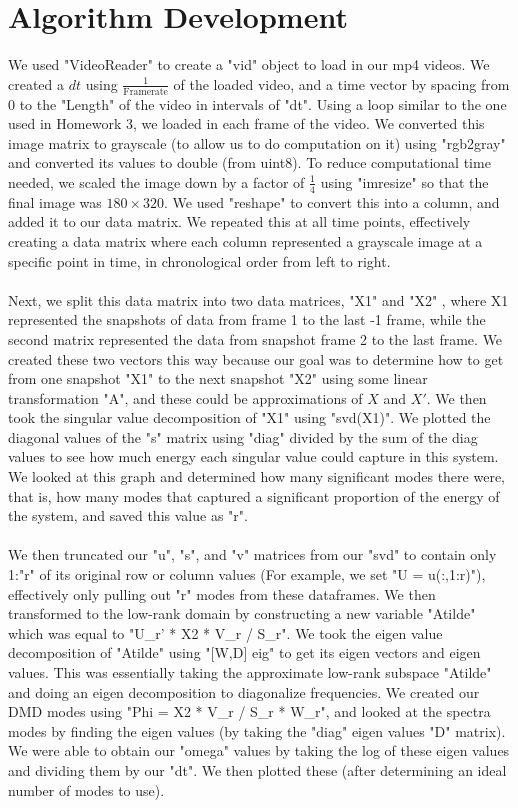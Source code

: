 \documentclass{article}
\begin{document}
\section*{\fontsize{19}{15}\selectfont Algorithm Development}
We used "VideoReader" to create a "vid" object to load in our mp4 videos. We created a $dt$ using $\frac{1}{\text{Framerate}}$ of the loaded video, and a time vector by spacing from 0 to the "Length" of the video in intervals of "dt". Using a loop similar to the one used in Homework 3, we loaded in each frame of the video. We converted this image matrix to grayscale (to allow us to do computation on it) using "rgb2gray" and converted its values to double (from uint8). To reduce computational time needed, we scaled the image down by a factor of $\frac{1}{4}$ using "imresize" so that the final image was $180\times320$. We used "reshape" to convert this into a column, and added it to our data matrix. We repeated this at all time points, effectively creating a data matrix where each column represented a grayscale image at a specific point in time, in chronological order from left to right. \\ \\
	Next, we split this data matrix into two data matrices, "X1" and "X2" , where X1 represented the snapshots of data from frame 1 to the last -1 frame, while the second matrix represented the data from snapshot frame 2 to the last frame. We created these two vectors this way because our goal was to determine how to get from one snapshot "X1" to the next snapshot "X2" using some linear transformation "A", and these could be approximations of $X$ and $X'$. We then took the singular value decomposition of "X1" using "svd(X1)". We plotted the diagonal values of the "s" matrix using "diag" divided by the sum of the diag values to see how much energy each singular value could capture in this system. We looked at this graph and determined how many significant modes there were, that is, how many modes that captured a significant proportion of the energy of the system, and saved this value as "r". \\ \\
We then truncated our "u", "s", and "v" matrices from our "svd" to contain only 1:"r" of its original row or column values (For example, we set "U = u(:,1:r)"), effectively only pulling out "r" modes from these dataframes. We then transformed to the low-rank domain by constructing a new variable "Atilde" which was equal to "U_r' * X2 * V_r / S_r". We took the eigen value decomposition of "Atilde" using "[W,D] eig" to get its eigen vectors and eigen values. This was essentially taking the approximate low-rank subspace "Atilde" and doing an eigen decomposition to diagonalize frequencies. We created our DMD modes using "Phi = X2 * V_r / S_r * W_r", and looked at the spectra modes by finding the eigen values (by taking the "diag" eigen values "D" matrix). We were able to obtain our "omega" values by taking the log of these eigen values and dividing them by our "dt". We then plotted these (after determining an ideal number of modes to use). \\ \\ 
\end{document}
